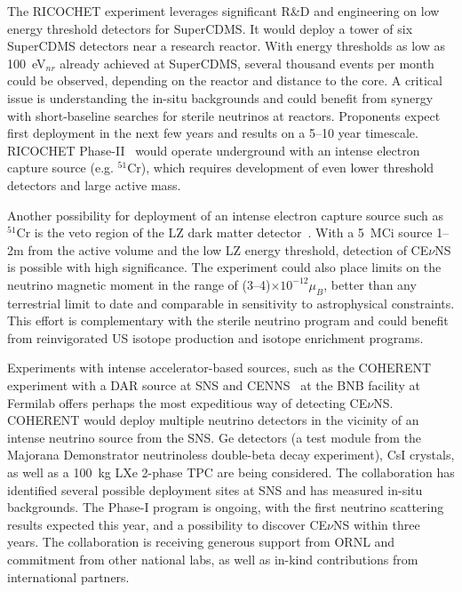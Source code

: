 The RICOCHET experiment leverages significant R\&D and engineering on
low energy threshold detectors for SuperCDMS. It would deploy a tower
of six SuperCDMS detectors near a research reactor. With energy
thresholds as low as 100~eV$_{nr}$ already achieved at SuperCDMS,
several thousand events per month could be observed, depending on the
reactor and distance to the core. A critical issue is understanding
the in-situ backgrounds and could benefit from synergy with
short-baseline searches for sterile neutrinos at reactors.  Proponents
expect first deployment in the next few years and results on a 5--10
year timescale.  RICOCHET Phase-II~\cite{Formaggio:2011jt} would
operate underground with an intense electron capture source
(e.g. $^{51}$Cr), which requires development of even lower threshold
detectors and large active mass.

Another possibility for deployment of an intense electron capture
source such as $^{51}$Cr is the veto region of the LZ dark matter
detector~\cite{Coloma:2014hka}. With a 5~MCi source 1--2m from the
active volume and the low LZ energy threshold, detection
of CE$\nu$NS is possible with high significance. The experiment could
also place limits on the neutrino magnetic moment in the range
of (3--4)$\times10^{-12}\mu_B$, better than any terrestrial limit to
date and comparable in sensitivity to astrophysical constraints. This
effort is complementary with the sterile neutrino program and
could benefit from reinvigorated US isotope production and
isotope enrichment programs.


Experiments with intense accelerator-based sources, such as the
COHERENT~\cite{Akimov:2013yow} experiment with a DAR source at SNS and
CENNS~\cite{Brice:2013fwa} at the BNB facility at Fermilab offers
perhaps the most expeditious way of detecting CE$\nu$NS. COHERENT
would deploy multiple neutrino detectors in the vicinity of an intense
neutrino source from the SNS. Ge detectors (a test module from
the {\sc Majorana Demonstrator\/} neutrinoless double-beta decay
experiment), CsI crystals, as well as a 100~kg LXe 2-phase TPC are
being considered. The collaboration has identified several possible
deployment sites at SNS and has measured in-situ backgrounds.  The
Phase-I program is  ongoing, with the first neutrino scattering
results expected this year, and a possibility to discover CE$\nu$NS
within three years. The collaboration is receiving generous support
from ORNL and commitment from other national labs, as well as in-kind
contributions from international partners. 


